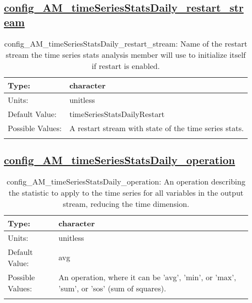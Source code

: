 \subsection[config\_AM\_timeSeriesStatsDaily\_restart\_stream]{\hyperref[sec:nm_tab_AM_timeSeriesStatsDaily]{config\_AM\_timeSeriesStatsDaily\_restart\_stream}}
\label{subsec:nm_sec_config_AM_timeSeriesStatsDaily_restart_stream}
\begin{center}
\begin{longtable}{| p{2.0in} || p{4.0in} |}
    \hline
    Type: & character \\
    \hline
    Units: & \si{unitless} \\
    \hline
    Default Value: & timeSeriesStatsDailyRestart \\
    \hline
    Possible Values: & A restart stream with state of the time series stats. \\
    \hline
    \caption{config\_AM\_timeSeriesStatsDaily\_restart\_stream: Name of the restart stream the time series stats analysis member will use to initialize itself if restart is enabled.}
\end{longtable}
\end{center}
\subsection[config\_AM\_timeSeriesStatsDaily\_operation]{\hyperref[sec:nm_tab_AM_timeSeriesStatsDaily]{config\_AM\_timeSeriesStatsDaily\_operation}}
\label{subsec:nm_sec_config_AM_timeSeriesStatsDaily_operation}
\begin{center}
\begin{longtable}{| p{2.0in} || p{4.0in} |}
    \hline
    Type: & character \\
    \hline
    Units: & \si{unitless} \\
    \hline
    Default Value: & avg \\
    \hline
    Possible Values: & An operation, where it can be 'avg', 'min', or 'max', 'sum', or 'sos' (sum of squares). \\
    \hline
    \caption{config\_AM\_timeSeriesStatsDaily\_operation: An operation describing the statistic to apply to the time series for all variables in the output stream, reducing the time dimension.}
\end{longtable}
\end{center}
